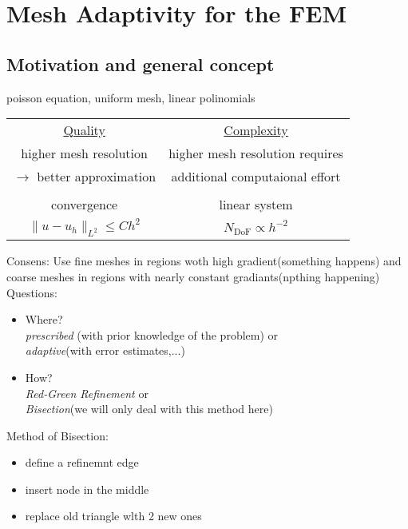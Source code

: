 \section{Mesh Adaptivity for the FEM}
\subsection{Motivation and general concept}

\begin{example}
	poisson equation, uniform mesh, linear polinomials
\end{example}

\begin{tabular}{c | c}
	\underline{Quality} & \underline{Complexity}\\
	higher mesh resolution & higher mesh resolution requires \\
	 $\to$ better approximation & additional computaional effort\\
	 & \\
	 convergence & linear system \\
	 $\|u-u_h\|_{L^2} \leq C h^2$ & $N_{\text{DoF}}\propto h^{-2}$
\end{tabular}

Consens: Use fine meshes in regions woth high gradient(something happens) and coarse meshes in regions with nearly constant gradiants(npthing happening)\\

Questions:
\begin{itemize}
	\item Where?\\
		\textit{prescribed} (with prior knowledge of the problem) or \\
		\textit{adaptive}(with error estimates,...)
	\item How?\\
		\textit{Red-Green Refinement} or \\
		\textit{Bisection}(we will only deal with this method here)
\end{itemize}

Method of Bisection:
\begin{itemize}
	\item define a refinemnt edge
	\item insert node in the middle
	\item replace old triangle wlth 2 new ones 
\end{itemize}


